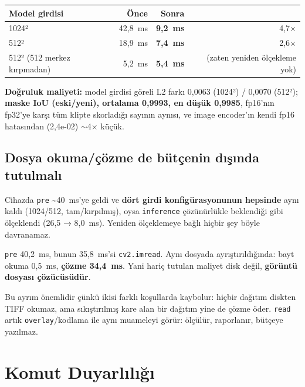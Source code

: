 \begin{olcum}[title={Ölçüldü (cihazda, aynı makine ve klip, yalnızca ön-işleme farklı)}]
\begin{center}
\begin{tabular}{lrrr}
  \toprule
  Model girdisi & Önce & Sonra & \\
  \midrule
  1024² & 42,8~ms & \textbf{9,2~ms} & 4,7× \\
  512² & 18,9~ms & \textbf{7,4~ms} & 2,6× \\
  512² (512 merkez kırpmadan) & 5,2~ms & \textbf{5,4~ms} & (zaten yeniden ölçekleme yok) \\
  \bottomrule
\end{tabular}
\end{center}
\textbf{Doğruluk maliyeti:} model girdisi göreli L2 farkı 0,0063 (1024²)
/ 0,0070 (512²); \textbf{maske IoU (eski/yeni), ortalama 0,9993, en düşük
0,9985}, fp16'nın fp32'ye karşı tüm klipte skorladığı sayının aynısı,
ve image encoder'ın kendi fp16 hatasından (2,4e-02) $\sim$4× küçük.
\end{olcum}

\subsection{Dosya okuma/çözme de bütçenin dışında tutulmalı}

Cihazda \texttt{pre} \textasciitilde40~ms'ye geldi ve \textbf{dört
girdi konfigürasyonunun hepsinde} aynı kaldı (1024/512, tam/kırpılmış),
oysa \texttt{inference} çözünürlükle beklendiği gibi ölçeklendi
(26,5 → 8,0~ms). Yeniden ölçeklemeye bağlı hiçbir şey böyle
davranamaz.

\begin{olcum}[title={Ölçüldü (cihazda); 2048×1536 16-bit tek-kanallı TIFF ile doğrulandı}]
\texttt{pre} 40,2~ms, bunun 35,8~ms'si \texttt{cv2.imread}. Aynı dosyada
ayrıştırıldığında: bayt okuma 0,5~ms, \textbf{çözme 34,4~ms}. Yani hariç
tutulan maliyet disk değil, \textbf{görüntü dosyası çözücüsüdür}.
\end{olcum}

Bu ayrım önemlidir çünkü ikisi farklı koşullarda kaybolur: hiçbir
dağıtım diskten TIFF okumaz, ama sıkıştırılmış kare alan bir dağıtım
yine de çözme öder. \texttt{read} artık \texttt{overlay}/kodlama ile
aynı muameleyi görür: ölçülür, raporlanır, bütçeye yazılmaz.

\section{Komut Duyarlılığı}


